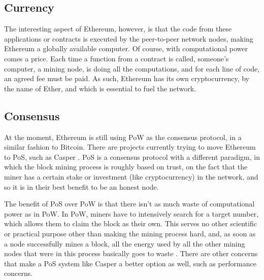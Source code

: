 

\subsection{Currency}

The interesting aspect of Ethereum, however, is that the code from these applications or contracts is executed by the peer-to-peer network nodes, making Ethereum a globally available computer. Of course, with computational power comes a price. Each time a function from a contract is called, someone's computer, a mining node, is doing all the computations, and for each line of code, an agreed fee must be paid. As such, Ethereum has its own cryptocurrency, by the name of Ether, and which is essential to fuel the network.

\subsection{Consensus}

At the moment, Ethereum is still using PoW as the consensus protocol, in a similar fashion to Bitcoin. There are projects currently trying to move Ethereum to PoS, such as Casper \cite{Buterin2017}. PoS is a consensus protocol with a different paradigm, in which the block mining process is roughly based on trust, on the fact that the miner has a certain stake or investment (like cryptocurrency) in the network, and so it is in their best benefit to be an honest node. 

The benefit of PoS over PoW is that there isn't as much waste of computational power as in PoW. In PoW, miners have to intensively search for a target number, which allows them to claim the block as their own. This serves no other scientific or practical purpose other than making the mining process hard, and, as soon as a node successfully mines a block, all the energy used  by all the other mining nodes that were in this process basically goes to waste \cite{Buterin2013}. There are other concerns that make a PoS system like Casper a better option as well, such as performance concerns. 

